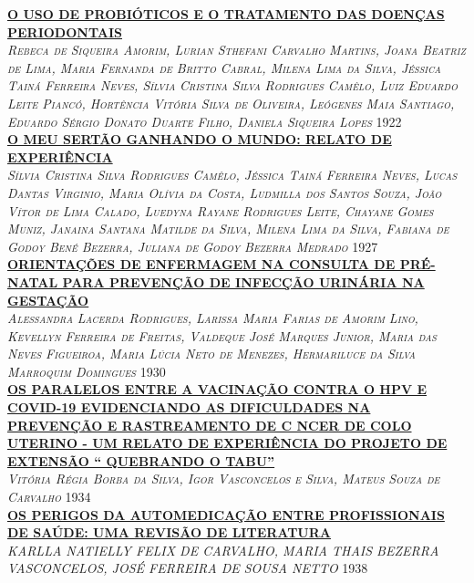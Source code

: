\noindent \textsc{\hyperlink{trabalhos/249742.pdf.1}{\textbf{O USO DE PROBIÓTICOS E O TRATAMENTO DAS DOENÇAS PERIODONTAIS}}}\\ 
\noindent \textsc{\textit{Rebeca de Siqueira Amorim, Lurian Sthefani Carvalho Martins, Joana Beatriz de Lima, Maria Fernanda de Britto Cabral, Milena Lima da Silva, Jéssica Tainá Ferreira Neves, Sílvia Cristina Silva Rodrigues Camêlo, Luiz Eduardo Leite Piancó, Hortência Vitória Silva de Oliveira, Leógenes Maia Santiago, Eduardo Sérgio Donato Duarte Filho, Daniela Siqueira Lopes}} \hfill 1922\\ 

\noindent \textsc{\hyperlink{trabalhos/250265.pdf.1}{\textbf{O MEU SERTÃO GANHANDO O MUNDO: RELATO DE EXPERIÊNCIA}}}\\ 
\noindent \textsc{\textit{Sílvia Cristina Silva Rodrigues Camêlo, Jéssica Tainá Ferreira Neves, Lucas Dantas Virginio, Maria Olívia da Costa, Ludmilla dos Santos Souza, João Vítor de Lima Calado, Luedyna Rayane Rodrigues Leite, Chayane Gomes Muniz, Janaina Santana Matilde da Silva, Milena Lima da Silva, Fabiana de Godoy Bené Bezerra, Juliana de Godoy Bezerra Medrado}} \hfill 1927\\ 

\noindent \textsc{\hyperlink{trabalhos/250195.pdf.1}{\textbf{ORIENTAÇÕES DE ENFERMAGEM NA CONSULTA DE PRÉ-NATAL PARA PREVENÇÃO DE INFECÇÃO URINÁRIA NA GESTAÇÃO}}}\\ 
\noindent \textsc{\textit{Alessandra Lacerda Rodrigues, Larissa Maria Farias de Amorim Lino, Kevellyn Ferreira de Freitas, Valdeque José Marques Junior, Maria das Neves Figueiroa, Maria Lúcia Neto de Menezes, Hermariluce da Silva Marroquim Domingues}} \hfill 1930\\ 

\noindent \textsc{\hyperlink{trabalhos/250120.pdf.1}{\textbf{OS PARALELOS ENTRE A VACINAÇÃO CONTRA O HPV E  COVID-19 EVIDENCIANDO AS DIFICULDADES NA PREVENÇÃO E RASTREAMENTO DE C NCER DE COLO UTERINO - UM RELATO DE EXPERIÊNCIA DO PROJETO DE EXTENSÃO “ QUEBRANDO O TABU”}}}\\ 
\noindent \textsc{\textit{Vitória Régia Borba da Silva, Igor Vasconcelos e Silva, Mateus Souza de Carvalho}} \hfill 1934\\ 

\noindent \textsc{\hyperlink{trabalhos/251735.pdf.1}{\textbf{OS PERIGOS DA AUTOMEDICAÇÃO ENTRE PROFISSIONAIS DE SAÚDE: UMA REVISÃO DE LITERATURA}}}\\ 
\noindent \textsc{\textit{KARLLA NATIELLY FELIX DE CARVALHO, MARIA THAIS BEZERRA VASCONCELOS, JOSÉ FERREIRA DE SOUSA NETTO}} \hfill 1938\\ 

